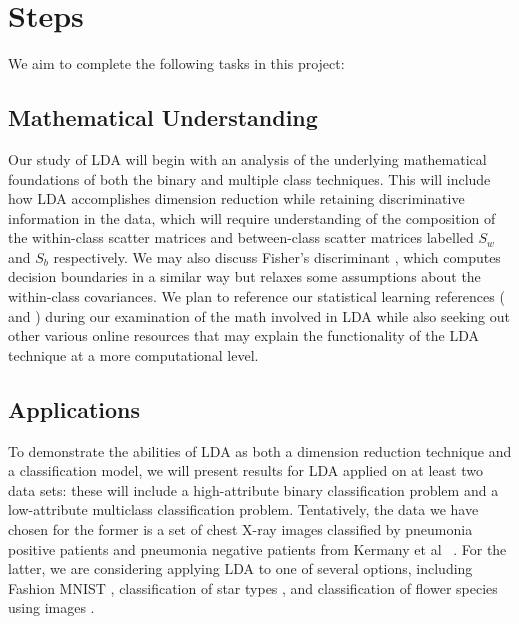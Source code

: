 \documentclass[letterpaper, 10 pt, conference]{ieeeconf}  %
\begin{document}
\section{Steps}
We aim to complete the following tasks in this project:

\subsection{Mathematical Understanding}
Our study of LDA will begin with an analysis of the underlying mathematical foundations of both the binary and multiple class techniques. This will include how LDA accomplishes dimension reduction while retaining discriminative information in the data, which will require understanding of the composition of the within-class scatter matrices and between-class scatter matrices labelled $S_w$ and $S_b$ respectively. We may also discuss Fisher's discriminant \cite{fisher}, which computes decision boundaries in a similar way but relaxes some assumptions about the within-class covariances. We plan to reference our statistical learning references (\cite{friedman2001elements} and \cite{james2013introduction}) during our examination of the math involved in LDA while also seeking out other various online resources that may explain the functionality of the LDA technique at a more computational level.

\subsection{Applications}
To demonstrate the abilities of LDA as both a dimension reduction technique and a classification model, we will present results for LDA applied on at least two data sets: these will include a high-attribute binary classification problem and a low-attribute multiclass classification problem. Tentatively, the data we have chosen for the former is a set of chest X-ray images classified by pneumonia positive patients and pneumonia negative patients from Kermany et al ~\cite{kermanyetal2018}. For the latter, we are considering applying LDA to one of several options, including Fashion MNIST \cite{xiao2017/online}, classification of star types \cite{starclass}, and classification of flower species using images \cite{FlowersRecognition}.
\end{document}
